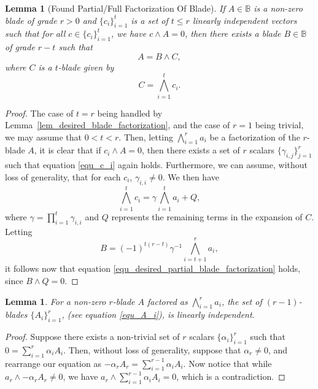 \documentclass{birkjour}
\newtheorem{lem}[thm]{Lemma}
\theoremstyle{definition}
\theoremstyle{remark}
\numberwithin{equation}{section}
\newcommand{\B}{\mathbb{B}}
\begin{document}
\begin{lem}[Found Partial/Full Factorization Of Blade]\label{lem_desired_partial_blade_factorization}
If $A\in\B$ is a non-zero blade of grade $r>0$ and $\{c_i\}_{i=1}^t$ is a set of $t\leq r$ linearly
independent vectors such that for all $c\in\{c_i\}_{i=1}^t$, we have $c\wedge A=0$, then there
exists a blade $B\in\B$ of grade $r-t$ such that
\begin{equation}\label{equ_desired_partial_blade_factorization}
A=B\wedge C,
\end{equation}
where $C$ is a $t$-blade given by
\begin{equation}
C = \bigwedge_{i=1}^t c_i.
\end{equation}
\end{lem}
\begin{proof}
The case of $t=r$ being handled by Lemma~\ref{lem_desired_blade_factorization}, and the
case of $r=1$ being trivial, we may assume that $0<t<r$.  Then, letting $\bigwedge_{i=1}^r a_i$
be a factorization of the $r$-blade $A$, it is clear that if $c_i\wedge A=0$, then there exists a
set of $r$ scalars $\{\gamma_{i,j}\}_{j=1}^r$ such that equation \eqref{equ_c_i} again holds.
Furthermore, we can assume, without loss of generality, that for each $c_i$, $\gamma_{i,i}\neq 0$.
We then have
\begin{equation}
\bigwedge_{i=1}^t c_i = \gamma\bigwedge_{i=1}^t a_i + Q,
\end{equation}
where $\gamma=\prod_{i=1}^t\gamma_{i,i}$ and $Q$ represents the remaining terms in the
expansion of $C$.  Letting
\begin{equation}
B=(-1)^{t(r-t)}\gamma^{-1}\bigwedge_{i=t+1}^r a_i,
\end{equation}
it follows now that equation \eqref{equ_desired_partial_blade_factorization} holds, since $B\wedge Q=0$.
\end{proof}


\begin{lem}\label{lem_lin_indep_blades}
For a non-zero $r$-blade $A$ factored as $\bigwedge_{i=1}^r a_i$, the set of
$(r-1)$-blades $\{A_i\}_{i=1}^r$, (see equation \eqref{equ_A_i}), is linearly independent.
\end{lem}
\begin{proof}
Suppose there exists a non-trivial set of $r$ scalars $\{\alpha_i\}_{i=1}^r$
such that $0 = \sum_{i=1}^r\alpha_i A_i$.
Then, without loss of generality, suppose that $\alpha_r\neq 0$, and rearrange
our equation as $-\alpha_rA_r=\sum_{i=1}^{r-1}\alpha_iA_i$.  Now notice
that while $a_r\wedge-\alpha_rA_r\neq 0$, we have $a_r\wedge\sum_{i=1}^{r-1}\alpha_iA_i=0$,
which is a contradiction.
\end{proof}
\end{document}
